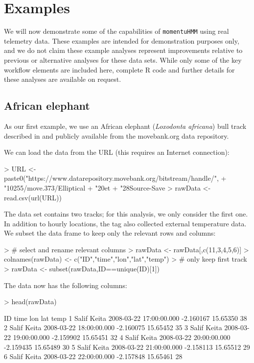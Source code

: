 \documentclass[12pt]{article}
\begin{document}
\section{Examples}
\label{sec:example}
We will now demonstrate some of the capabilities of \verb|momentuHMM| using real telemetry data. These examples are intended for demonstration purposes only, and we do not claim these example analyses represent improvements relative to previous or alternative analyses for these data sets. While only some of the key workflow elements are included here, complete R code and further details for these analyses are available on request.

\subsection{African elephant}
\label{sec:elephant}

As our first example, we use an African elephant ({\it Loxodonta africana}) bull track described in \cite{WallEtAl2014} and publicly available from the movebank.org data repository. 

We can load the data from the URL (this requires an Internet connection):
\begin{Schunk}
\begin{Sinput}
> URL <- paste0("https://www.datarepository.movebank.org/bitstream/handle/",
+               "10255/move.373/Elliptical%
+               "20et%
+               "28Source-Save%
> rawData <- read.csv(url(URL))
\end{Sinput}
\end{Schunk}

The data set contains two tracks; for this analysis, we only consider the first one. In addition to hourly locations, the tag also collected external temperature data. We subset the data frame to keep only the relevant rows and columns:
\begin{Schunk}
\begin{Sinput}
> # select and rename relevant columns
> rawData <- rawData[,c(11,3,4,5,6)]
> colnames(rawData) <- c("ID","time","lon","lat","temp")
> # only keep first track
> rawData <- subset(rawData,ID==unique(ID)[1])
\end{Sinput}
\end{Schunk}

The data now has the following columns:
\begin{Schunk}
\begin{Sinput}
> head(rawData)
\end{Sinput}
\begin{Soutput}
           ID                    time       lon      lat temp
1 Salif Keita 2008-03-22 17:00:00.000 -2.160167 15.65350   38
2 Salif Keita 2008-03-22 18:00:00.000 -2.160075 15.65452   35
3 Salif Keita 2008-03-22 19:00:00.000 -2.159902 15.65451   32
4 Salif Keita 2008-03-22 20:00:00.000 -2.159435 15.65489   30
5 Salif Keita 2008-03-22 21:00:00.000 -2.158113 15.65512   29
6 Salif Keita 2008-03-22 22:00:00.000 -2.157848 15.65461   28
\end{Soutput}
\end{Schunk}
\end{document}
